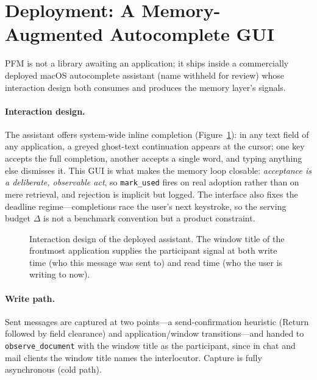 \documentclass[letterpaper]{article}
\newcommand{\todo}[1]{\textbf{\textcolor{red}{[TODO: #1]}}}
\newcommand{\figplaceholder}[2]{%
  \fbox{\parbox[c][#1][c]{0.94\columnwidth}{\centering\todo{#2}}}}
\newcommand{\deadline}{\Delta}
\begin{document}
\section{Deployment: A Memory-Augmented Autocomplete GUI}

PFM is not a library awaiting an application; it ships inside a
commercially deployed macOS autocomplete assistant (name withheld for
review) whose interaction design both consumes and produces the memory
layer's signals.

\paragraph{Interaction design.}
The assistant offers system-wide inline completion
(Figure~\ref{fig:gui}): in any text field of any application, a greyed
ghost-text continuation appears at the cursor;
one key accepts the full completion, another accepts a single word, and
typing anything else dismisses it. This GUI is what makes the memory loop
closable: \emph{acceptance is a deliberate, observable act}, so
\texttt{mark\_used} fires on real adoption rather than on mere retrieval,
and rejection is implicit but logged. The interface also fixes the
deadline regime---completions race the user's next keystroke, so the
serving budget $\deadline$ is not a benchmark convention but a product
constraint.

\begin{figure}[t]
\centering
\figplaceholder{4.6cm}{Figure: annotated GUI walkthrough. (a) user typing
in a mail client, ghost text completing a remembered amount; (b) the same
completion with memory disabled (generic guess); (c) callouts: window
title captured as participant, accept key, memory indicator. Screenshots
from the deployed app; anonymize all identifying chrome.}
\caption{Interaction design of the deployed assistant. The window title of
the frontmost application supplies the participant signal at both write
time (who this message was sent to) and read time (who the user is
writing to now).}
\label{fig:gui}
\end{figure}

\paragraph{Write path.}
Sent messages are captured at two points---a send-confirmation heuristic
(Return followed by field clearance) and application/window
transitions---and handed to \texttt{observe\_document} with the window
title as the participant, since in chat and mail clients the window title
names the interlocutor. Capture is fully asynchronous (cold path).
\end{document}
